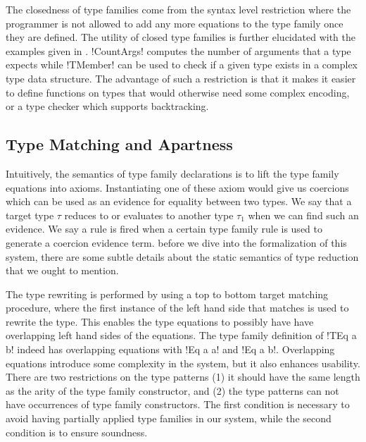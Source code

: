 \documentclass[format=acmsmall,manuscript,review,screen,nonacm,margin=1in,11pt]{acmart}
\begin{document}
The closedness of type families come from the syntax level restriction
where the programmer is not allowed to add any more equations to the type family once
they are defined. %
The utility of closed type families is further elucidated with the examples
given in . !CountArgs! computes the number of arguments that a type expects while
!TMember! can be used to check if a given type exists in a complex type data structure.
The advantage of such a restriction is that it makes it easier to define functions on types
that would otherwise need some complex encoding, or a type checker which supports backtracking.

\subsection{Type Matching and Apartness}\label{subsec:tf-closed-apartness}
Intuitively, the semantics of type family declarations is to lift the type family equations into axioms.
Instantiating one of these axiom would give us coercions which can be
used as an evidence for equality between two types. We say that a target type $\tau$
reduces to or evaluates to another type $\tau_1$ when we can
find such an evidence. We say a rule is fired when a certain type family rule is used
to generate a coercion evidence term. %
before we dive into the formalization of this system, there are some subtle details about
the static semantics of type reduction that we ought to mention.%

The type rewriting is performed by using a top to bottom target matching procedure,
where the first instance of the left hand side that matches is used to rewrite the type.
This enables the type equations to possibly have have overlapping left hand sides of the equations.  
The type family definition of !TEq a b! indeed has overlapping equations with !Eq a a! and !Eq a b!.
Overlapping equations introduce some complexity in the system, but it also enhances usability. 
There are two restrictions on the type patterns
(1) it should  have the same length as the arity of the type family constructor, and
(2) the type patterns can not have occurrences of type family constructors.
The first condition is necessary to avoid having partially applied type families in our system,
while the second condition is to ensure soundness.
\end{document}
